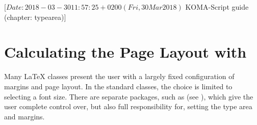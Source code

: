 %
%
%
%
%
%
%
%
% 
%
%
%
%

%
                 [$Date: 2018-03-30 11:57:25 +0200 (Fri, 30 Mar 2018) $
                  KOMA-Script guide (chapter: typearea)]


\chapter{Calculating the Page Layout with }

\BeginIndexGroup%
%
Many {\LaTeX} classes present the
user with a largely fixed configuration of margins and page layout. In the
standard classes, the choice is limited to selecting a font size.
There are separate packages, such as 
(see \cite{package:geometry}), which give the user complete control over, but
also full responsibility for, setting the type area and margins.

